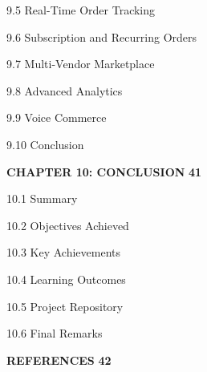 \documentclass[12pt,a4paper]{report}
\begin{document}
\hspace{1.5em} 9.5 Real-Time Order Tracking 

\hspace{1.5em} 9.6 Subscription and Recurring Orders 

\hspace{1.5em} 9.7 Multi-Vendor Marketplace 

\hspace{1.5em} 9.8 Advanced Analytics 

\hspace{1.5em} 9.9 Voice Commerce 

\hspace{1.5em} 9.10 Conclusion 

\vspace{8pt}

\noindent \textbf{CHAPTER 10: CONCLUSION} \dotfill \textbf{41}

\hspace{1.5em} 10.1 Summary 

\hspace{1.5em} 10.2 Objectives Achieved 

\hspace{1.5em} 10.3 Key Achievements 

\hspace{1.5em} 10.4 Learning Outcomes 

\hspace{1.5em} 10.5 Project Repository 

\hspace{1.5em} 10.6 Final Remarks 

\vspace{8pt}

\noindent \textbf{REFERENCES} \dotfill \textbf{42}
\end{document}
